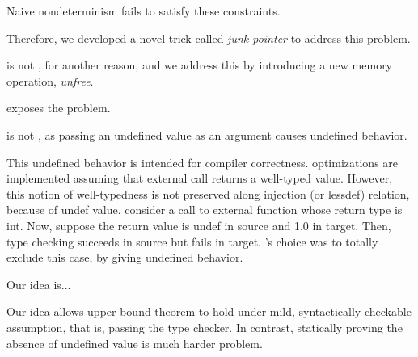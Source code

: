 {Naive nondeterminism fails to satisfy these constraints.

Therefore, we developed a novel trick called \textit{junk pointer} to address this problem.





%

\ccc{} is not \lbound{}, for another reason, and we address this by introducing a new memory operation, \textit{unfree}.


 exposes the problem.






\ccc{} is not \ubound{}, as passing an undefined value as an argument causes undefined behavior.

This undefined behavior is intended for compiler correctness.
\cc{} optimizations are implemented assuming that external call returns a well-typed value.
However, this notion of well-typedness is not preserved along injection (or lessdef) relation, because of undef value.
\Eg{} consider a call to external function whose return type is int.
Now, suppose the return value is undef in source and 1.0 in target.
Then, type checking succeeds in source but fails in target.
\ccc{}'s choice was to totally exclude this case, by giving undefined behavior.

Our idea is...

Our idea allows upper bound theorem to hold under mild, syntactically checkable assumption, that is, passing the type checker.
In contrast, statically proving the absence of undefined value is much harder problem. 







}
